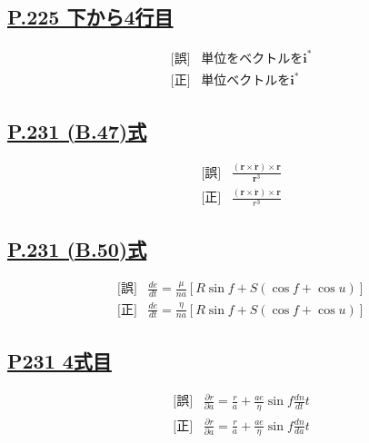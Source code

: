 \documentclass[9pt,fleqn]{bxjsarticle}
\begin{document}
\subsection*{\underline{P.225 下から4行目}}
\begin{align*}
    &\text{[誤]} \hspace{10pt} \text{単位をベクトルを}\bm{i}^*　\\
    &\text{[正]} \hspace{10pt} \text{単位ベクトルを}\bm{i}^* 
\end{align*}

\subsection*{\underline{P.231 (B.47)式}}
\begin{align*}
    &\text{[誤]} \hspace{10pt} \frac{(\bm{r}\times \dot{\bm{r}}) \times \bm{r}}{\bm{r}^3} \\
    &\text{[正]} \hspace{10pt} \frac{(\bm{r}\times \dot{\bm{r}}) \times \bm{r}}{r^3} 
\end{align*}

\subsection*{\underline{P.231 (B.50)式}}
\begin{align*}
    &\text{[誤]} \hspace{10pt} \frac{de}{dt} = \frac{\mu}{na}\left[R\sin{f}+S(\cos{f}+\cos{u})\right] \\
    &\text{[正]} \hspace{10pt} \frac{de}{dt} = \frac{\eta}{na}\left[R\sin{f}+S(\cos{f}+\cos{u})\right] 
\end{align*}

\subsection*{\underline{P231 4式目}}
\begin{align*}
    &\text{[誤]} \hspace{10pt} \frac{\partial{r}}{\partial{a}} = \frac{r}{a} + \frac{ae}{\eta}\sin{f}\frac{dn}{dt}t \\
    &\text{[正]} \hspace{10pt} \frac{\partial{r}}{\partial{a}} = \frac{r}{a} + \frac{ae}{\eta}\sin{f}\frac{dn}{da}t 
\end{align*}
\end{document}
